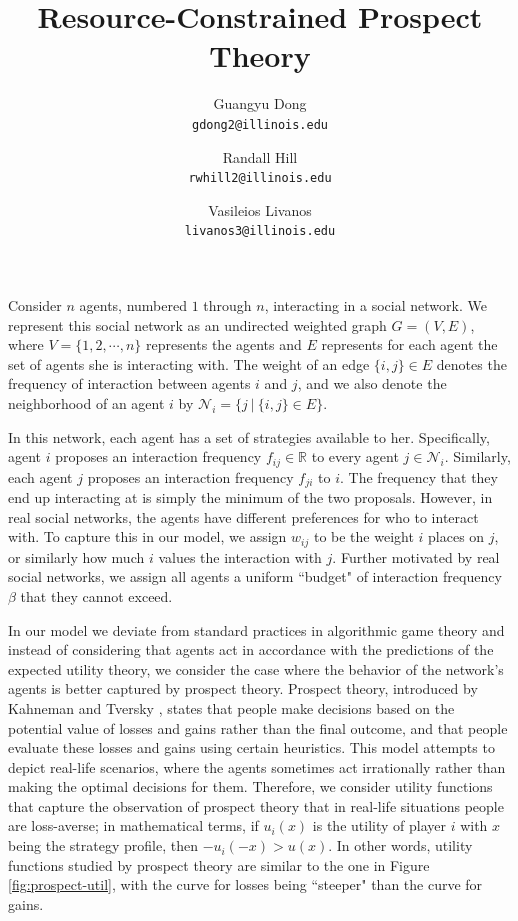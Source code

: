 \documentclass[A4paper,11pt]{article}
\author{
	{\sc Guangyu Dong} \\
	\texttt{gdong2@illinois.edu}
	\and
	{\sc Randall Hill} \\
	\texttt{rwhill2@illinois.edu}
	\and
	{\sc Vasileios Livanos} \\
	\texttt{livanos3@illinois.edu}
}
\title{
Resource-Constrained Prospect Theory
}
\date{}
\begin{document}
 \maketitle

\par Consider $n$ agents, numbered $1$ through $n$, interacting in a social network. We represent this social network as
an undirected weighted graph $G = (V, E)$, where $V = \{ 1, 2, \cdots, n \}$ represents the agents and $E$ represents
for each agent the set of agents she is interacting with. The weight of an edge $\{ i, j \} \in E$ denotes the frequency of
interaction between agents $i$ and $j$, and we also denote the neighborhood of an agent $i$ by
$\mathcal{N}_i = \big\{ j \: | \: \{ i, j \} \in E \big\}$.

\par In this network, each agent has a set of strategies available to her. Specifically, agent $i$ proposes an
interaction frequency $f_{ij} \in \mathbb{R}$ to every agent $j \in \mathcal{N}_i$. Similarly, each agent $j$ proposes an
interaction frequency $f_{ji}$ to $i$. The frequency that they end up interacting at is simply the minimum of the two
proposals. However, in real social networks, the agents have different preferences for who to interact with. To capture this
in our model, we assign $w_{ij}$ to be the weight $i$ places on $j$, or similarly how much $i$ values the interaction with $j$.
Further motivated by real social networks, we assign all agents a uniform ``budget" of interaction frequency $\beta$ that they
cannot exceed.

\par In our model we deviate from standard practices in algorithmic game theory and instead of considering that agents act
in accordance with the predictions of the expected utility theory, we consider the case where the behavior of the network's
agents is better captured by prospect theory. Prospect theory, introduced by Kahneman and Tversky \cite{KT}, states that people
make decisions based on the potential value of losses and gains rather than the final outcome, and that people evaluate these
losses and gains using certain heuristics. This model attempts to depict real-life scenarios, where the agents sometimes act
irrationally rather than making the optimal decisions for them. Therefore, we consider utility functions that capture the
observation of prospect theory that in real-life situations people are loss-averse; in mathematical terms, if $u_i(x)$ is the
utility of player $i$ with $x$ being the strategy profile, then $- u_i(-x) > u(x)$. In other words, utility functions studied
by prospect theory are similar to the one in Figure \ref{fig:prospect-util}, with the curve for losses being ``steeper" than
the curve for gains.
\end{document}
